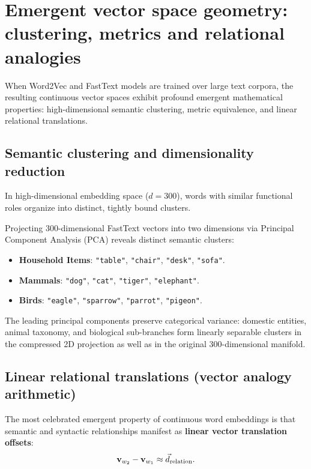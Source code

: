 \documentclass[../../main.tex]{subfiles}
\begin{document}
\clearpage
\section{Emergent vector space geometry: clustering, metrics and relational analogies}
\label{sec:vector_geometry_metrics}

When Word2Vec and FastText models are trained over large text corpora, the resulting continuous vector spaces exhibit profound emergent mathematical properties: high-dimensional semantic clustering, metric equivalence, and linear relational translations.

\subsection{Semantic clustering and dimensionality reduction}
\label{subsec:semantic_clustering_pca}

In high-dimensional embedding space ($d = 300$), words with similar functional roles organize into distinct, tightly bound clusters.

Projecting 300-dimensional FastText vectors into two dimensions via Principal Component Analysis (PCA) reveals distinct semantic clusters:
\begin{itemize}
    \item \textbf{Household Items}: \texttt{"table"}, \texttt{"chair"}, \texttt{"desk"}, \texttt{"sofa"}.
    \item \textbf{Mammals}: \texttt{"dog"}, \texttt{"cat"}, \texttt{"tiger"}, \texttt{"elephant"}.
    \item \textbf{Birds}: \texttt{"eagle"}, \texttt{"sparrow"}, \texttt{"parrot"}, \texttt{"pigeon"}.
\end{itemize}
The leading principal components preserve categorical variance: domestic entities, animal taxonomy, and biological sub-branches form linearly separable clusters in the compressed 2D projection as well as in the original 300-dimensional manifold.

\subsection{Linear relational translations (vector analogy arithmetic)}
\label{subsec:relational_analogies}

The most celebrated emergent property of continuous word embeddings is that semantic and syntactic relationships manifest as \textbf{linear vector translation offsets}:
\begin{equation}
\label{eq:relational_offset_concept}
\mathbf{v}_{w_2} - \mathbf{v}_{w_1} \approx \vec{d}_{\text{relation}}.
\end{equation}
\end{document}

